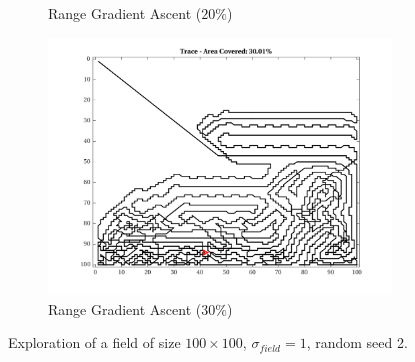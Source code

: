 \begin{figure}[htb!]
\begin{subfigure}[t]{0.32\textwidth}
        \ssp
        \captionsetup{skip=0.20\baselineskip,size=footnotesize}
        \caption{Range Gradient Ascent ($20\%$)}
    \end{subfigure}%
    \begin{subfigure}[t]{0.32\textwidth}
        \centering
        \includegraphics[width=\linewidth]{figures/hbresults/path_gr_30p_100x100_sf_1_seed_2.png}
        \ssp
        \captionsetup{skip=0.20\baselineskip,size=footnotesize}
        \caption{Range Gradient Ascent ($30\%$)}
    \end{subfigure}%
    \ssp
    \captionsetup{skip=0.20\baselineskip}
    \caption{Exploration of a field of size $100 \times 100$, $\sigma_{field} = 1$, random seed 2.}
    \label{fig:sf1}
\end{figure}

\FloatBarrier
\clearpage